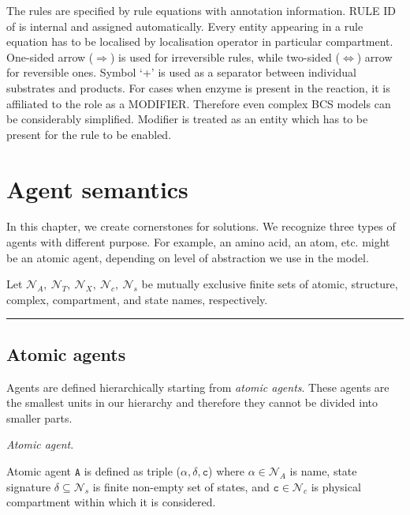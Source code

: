 \documentclass{elsarticle}
\begin{document}
The rules are specified by rule equations with annotation information. RULE ID of is internal and assigned automatically. Every entity appearing in a rule equation has to be localised by localisation operator in particular compartment. One-sided arrow ($\Rightarrow$) is used for irreversible rules, while two-sided ($\Leftrightarrow$) arrow for reversible ones. Symbol `+' is used as a separator between individual substrates and products. For cases when enzyme is present in the reaction, it is affiliated to the role as a MODIFIER. Therefore even complex BCS models can be considerably simplified. Modifier is treated as an entity which has to be present for the rule to be enabled. 

\section{Agent semantics}

In this chapter, we create cornerstones for solutions. We recognize three types of agents with different purpose. For example, an amino acid, an atom, etc. might be an atomic agent, depending on level of abstraction we use in the model.

Let $\mathcal{N}_{A},~\mathcal{N}_{T},~\mathcal{N}_{X},~\mathcal{N}_{c},~\mathcal{N}_{s}$ be mutually exclusive finite sets of atomic, structure, complex, compartment, and state names, respectively.

\noindent\rule{\textwidth}{1pt}


\subsection{Atomic agents}

Agents are defined hierarchically starting from \emph{atomic agents}. These agents are the smallest units in our hierarchy and therefore they cannot be divided into smaller parts. 

\begin{definition}
\textit{Atomic agent}. 

\noindent Atomic agent $\mathtt{A}$ is defined as triple ($\alpha, \delta, \mathtt{c}$) where $\alpha \in \mathcal{N}_{A}$ is name, state signature $\delta \subseteq \mathcal{N}_{s}$ is finite non-empty set of states, and $\mathtt{c} \in \mathcal{N}_{c}$ is physical compartment within which it is considered.
\end{definition}
\end{document}
